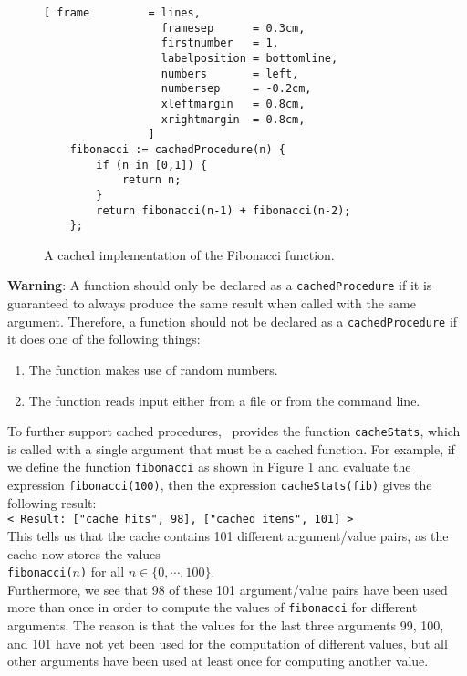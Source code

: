 \begin{figure}[!ht]
\centering
\begin{Verbatim}[ frame         = lines, 
                  framesep      = 0.3cm, 
                  firstnumber   = 1,
                  labelposition = bottomline,
                  numbers       = left,
                  numbersep     = -0.2cm,
                  xleftmargin   = 0.8cm,
                  xrightmargin  = 0.8cm,
                ]
    fibonacci := cachedProcedure(n) {
        if (n in [0,1]) {
            return n;
        } 
        return fibonacci(n-1) + fibonacci(n-2);
    };
\end{Verbatim}
\vspace*{-0.3cm}
\caption{A cached implementation of the Fibonacci function.}
\label{fig:fibonacci-cached.stlx}
\end{figure}

\vspace*{0.3cm}

\noindent
\textbf{Warning}:  A function should only be declared as a \texttt{cachedProcedure} if it is
guaranteed to always produce the same result when called with the same argument.
Therefore, a function should not be declared as a \texttt{cachedProcedure} if it does one
of the following things:
\begin{enumerate}
\item The function makes use of random numbers.
\item The function reads input either from a file or from the command line.
\end{enumerate}
To further support cached procedures,  \setlx\ provides the function \texttt{cacheStats},
which is called with a single argument that must be a cached function.  For example, if
we define the function \texttt{fibonacci} as shown in Figure
\ref{fig:fibonacci-cached.stlx} and evaluate the expression \texttt{fibonacci(100)}, then
the expression \texttt{cacheStats(fib)} gives the following result:
\\[0.2cm]
\hspace*{1.3cm}
\texttt{< Result: {["cache hits", 98], ["cached items", 101]} >}
\\[0.2cm]
This tells us that the cache contains 101 different argument/value pairs, as the cache
now stores the values
\\[0.2cm]
\hspace*{1.3cm}
\texttt{fibonacci($n$)} \quad for all $n \in \{0,\cdots,100\}$.
\\[0.2cm]
Furthermore, we see that 98 of these 101 argument/value pairs have
been used more than once in order to
compute the values of \texttt{fibonacci} for different arguments.  The reason is that the
values for the last three arguments 99, 100, and 101 have not yet been used for the
computation of different values, but all other arguments have been used at least once for
computing another value.

